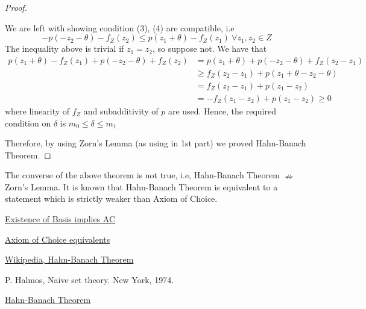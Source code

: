 \documentclass[11pt,a4paper]{article}
\begin{document}
\begin{proof}
\begin{enumerate}
$$            $$
            We are left with showing condition (3), (4) are compatible, i.e
            $$
                -p(-z_2 - \theta) - f_Z(z_2) \leq p(z_1 + \theta) - f_Z(z_1)\ \forall z_1, z_2  \in Z
            $$
            The inequality above is trivial if $z_1 = z_2$, so suppose not. We have that
            \begin{align*}
                p(z_1 + \theta) - f_Z(z_1) + p(-z_2 - \theta) + f_Z(z_2) &= p(z_1 + \theta) + p(-z_2 - \theta) + f_Z(z_2 - z_1)\\
                &\geq f_Z(z_2 - z_1) + p(z_1 + \theta - z_2 - \theta)\\
                &= f_Z(z_2 - z_1) + p(z_1 - z_2)\\
                &=  - f_Z(z_1 - z_2) + p(z_1 - z_2) \geq 0
            \end{align*}
            where linearity of $f_Z$ and subadditivity of $p$ are used. Hence, the required condition on $\delta$ is $m_0 \leq \delta \leq m_1$
        \end{enumerate}
    Therefore, by using Zorn's Lemma (as using in 1st part) we proved Hahn-Banach Theorem.
\end{proof}

\begin{remark}
    The converse of the above theorem is not true, i.e, Hahn-Banach Theorem $\nRightarrow$ Zorn's Lemma. It is known that Hahn-Banach Theorem is equivalent to a statement which is strictly weaker than Axiom of Choice.\cite{WikiHBT}
\end{remark}

\newpage

\begin{thebibliography}{9}

\href{http://www.math.lsa.umich.edu/~ablass/bases-AC.pdf}{Existence of Basis implies AC}

\href{http://www.borisbukh.org/MathStudiesAlgebra1718/notes_ac.pdf}{Axiom of Choice equivalents}

\href{https://en.wikipedia.org/wiki/Hahn-Banach_theorem#Relation_to_axiom_of_choice}{Wikipedia, Hahn-Banach Theorem}

P. Halmos, Naive set theory. New York, 1974.

\href{https://www.math.utah.edu/~tan/6710_FA/Hahn Banach Theorem.pdf}{Hahn-Banach Theorem}

\end{thebibliography}
\end{document}
